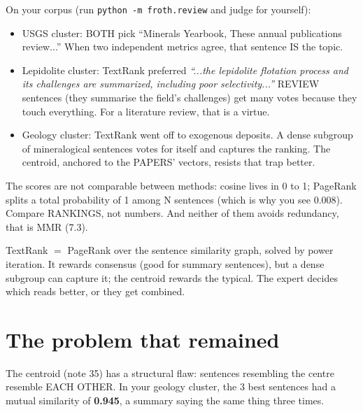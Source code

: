 \documentclass[11pt,a4paper]{article}
\begin{document}
On your corpus (run \texttt{python -m froth.review} and judge for yourself):

\begin{itemize}
  \item USGS cluster: BOTH pick ``Minerals Yearbook, These annual publications review...''
        When two independent metrics agree, that sentence IS the topic.
  \item Lepidolite cluster: TextRank preferred \emph{``...the lepidolite flotation process and
        its challenges are summarized, including poor selectivity...''} REVIEW sentences (they
        summarise the field's challenges) get many votes because they touch everything. For a
        literature review, that is a virtue.
  \item Geology cluster: TextRank went off to exogenous deposits. A dense subgroup of
        mineralogical sentences votes for itself and captures the ranking. The centroid,
        anchored to the PAPERS' vectors, resists that trap better.
\end{itemize}

\begin{ojo}
The scores are not comparable between methods: cosine lives in 0 to 1; PageRank splits a total
probability of 1 among N sentences (which is why you see 0.008). Compare RANKINGS, not numbers.
And neither of them avoids redundancy, that is MMR (7.3).
\end{ojo}

\begin{resumen}
TextRank $=$ PageRank over the sentence similarity graph, solved by power iteration. It rewards
consensus (good for summary sentences), but a dense subgroup can capture it; the centroid
rewards the typical. The expert decides which reads better, or they get combined.
\end{resumen}
\clearpage
{}
{}

\section{The problem that remained}

The centroid (note 35) has a structural flaw: sentences resembling the centre resemble EACH
OTHER. In your geology cluster, the 3 best sentences had a mutual similarity of \textbf{0.945},
a summary saying the same thing three times.
\end{document}
